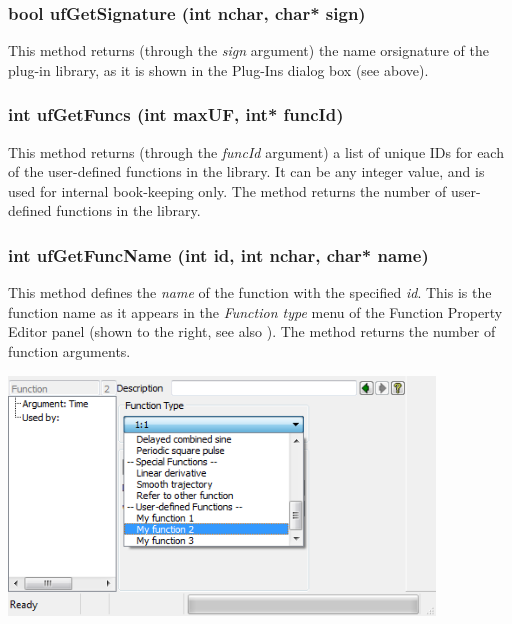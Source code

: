 \subsubsection{bool ufGetSignature (int nchar, char* sign)}

This method returns (through the {\sl sign} argument) the name orsignature
of the plug-in library, as it is shown in the Plug-Ins dialog box (see above).

\subsubsection{int ufGetFuncs (int maxUF, int* funcId)}

This method returns (through the {\sl funcId} argument) a list of unique IDs
for each of the user-defined functions in the library.
It can be any integer value, and is used for internal book-keeping only.
The method returns the number of user-defined functions in the library.

\subsubsection{int ufGetFuncName (int id, int nchar, char* name)}

\begin{minipage}{0.49\textwidth}
  \raggedright
  This method defines the {\sl name} of the function with the specified {\sl id}.
  This is the function name as it appears in the {\sl Function type} menu
  of the Function Property Editor panel (shown to the right,
  see also ).
  The method returns the number of function arguments.
\end{minipage}%
\begin{minipage}{0.51\textwidth}
  \raggedleft
  \includegraphics[trim=92 55 90 18,clip,width=0.85\textwidth]{Figures/2-FunctionType}
\end{minipage}

